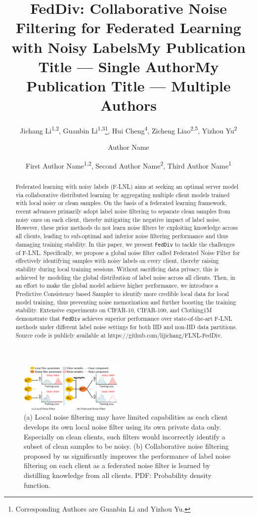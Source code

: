 \documentclass[letterpaper]{article} %
\title{FedDiv: Collaborative Noise Filtering for Federated Learning with Noisy Labels}
\author{
    Jichang Li\textsuperscript{\rm 1,\rm 2},
    Guanbin Li\textsuperscript{\rm 1,\rm 3}{\Large \thanks{Corresponding Authors are Guanbin Li and Yizhou Yu.}},
    Hui Cheng\textsuperscript{\rm 4},
    Zicheng Liao\textsuperscript{\rm 2,\rm 5},
    Yizhou Yu\textsuperscript{\rm 2{\small *}}
}
\title{My Publication Title --- Single Author}
\author {
    Author Name
}
\title{My Publication Title --- Multiple Authors}
\author {
    First Author Name\textsuperscript{\rm 1,\rm 2},
    Second Author Name\textsuperscript{\rm 2},
    Third Author Name\textsuperscript{\rm 1}
}
\begin{document}

\maketitle

\begin{abstract}
Federated learning with noisy labels (F-LNL) aims at seeking an optimal server model via collaborative distributed learning by aggregating multiple client models trained with local noisy or clean samples. On the basis of a federated learning framework, recent advances primarily adopt label noise filtering to separate clean samples from noisy ones on each client, thereby mitigating the negative impact of label noise. However, these prior methods do not learn noise filters by exploiting knowledge across all clients, leading to sub-optimal and inferior noise filtering performance and thus damaging training stability. In this paper, we present \texttt{FedDiv} to tackle the challenges of F-LNL. Specifically, we propose a global noise filter called Federated Noise Filter for effectively identifying samples with noisy labels on every client, thereby raising stability during local training sessions. Without sacrificing data privacy, this is achieved by modeling the global distribution of label noise across all clients. Then, in an effort to make the global model achieve higher performance, we introduce a Predictive Consistency based Sampler to identify more credible local data for local model training, thus preventing noise memorization and further boosting the training stability. Extensive experiments on CIFAR-10, CIFAR-100, and Clothing1M demonstrate that \texttt{FedDiv} achieves superior performance over state-of-the-art F-LNL methods under different label noise settings for both IID and non-IID data partitions. Source code is publicly available at https://github.com/lijichang/FLNL-FedDiv.
\end{abstract}

\begin{figure}[ht]

    \centering
    \includegraphics[width=0.45\textwidth]{figures/overview.pdf}

    \caption{
    (a) Local noise filtering may have limited capabilities as each client develops its own local noise filter using its own private data only. Especially on clean clients, such filters would incorrectly identify a subset of clean samples to be noisy.
    (b) Collaborative noise filtering proposed by us significantly improves the performance of label noise filtering on each client as a federated noise filter is learned by distilling knowledge from all clients.
    PDF: Probability density function.}
    \label{Figure:Overview}
\end{figure}
\end{document}
